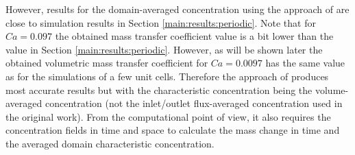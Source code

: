 \documentclass{article}
\begin{document}
However, results for the domain-averaged concentration using the approach of \citeauthor{vanbaten-circular} are close to simulation results in Section
\ref{main:results:periodic}. %
Note that for $Ca=0.097$ the obtained mass transfer coefficient value is a bit
lower than the value in Section \ref{main:results:periodic}. However, as will
be shown later the obtained volumetric mass transfer coefficient for
$Ca=0.0097$ has the same value as for the simulations of a few unit cells.
Therefore the approach of \citet{vanbaten-circular} produces most accurate results but with the characteristic concentration being the volume-averaged concentration (not the inlet/outlet flux-averaged concentration used in the original work). From the computational point of view, it also requires the concentration fields in time and space to calculate the mass change in time and the averaged domain
characteristic concentration.
\end{document}
